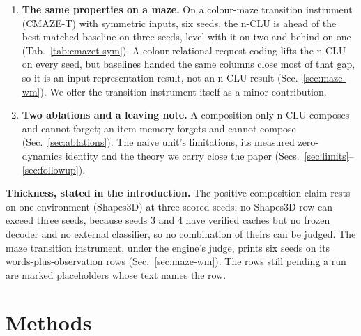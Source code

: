 \documentclass{article} %
\begin{document}
\begin{enumerate}
  separate, structural mechanism, a hole in a coupling table (Sec.~\ref{sec:hole}).
\item \textbf{The same properties on a maze.} On a colour-maze transition instrument (CMAZE-T) with
  symmetric inputs, six seeds, the n-CLU is ahead of
  the best matched baseline on three seeds, level with it on two and behind on one
  (Tab.~\ref{tab:cmazet-sym}). A colour-relational request coding lifts the n-CLU on every seed, but baselines handed the %
  same columns close most of that gap, so it is an input-representation result, not an n-CLU result
  (Sec.~\ref{sec:maze-wm}). We offer the transition instrument itself as a minor contribution.
\item \textbf{Two ablations and a leaving note.} A composition-only n-CLU composes and cannot
  forget; an item memory forgets and cannot compose (Sec.~\ref{sec:ablations}). The naive unit's
  limitations, its measured zero-dynamics identity and the theory we carry close the paper
  (Secs.~\ref{sec:limits}--\ref{sec:followup}).
\end{enumerate}

\noindent\textbf{Thickness, stated in the introduction.} The positive composition claim rests
on one environment (Shapes3D) at three scored seeds; no Shapes3D row can exceed three seeds,
because seeds 3 and 4 have verified caches but no frozen decoder and no external classifier, so no
combination of theirs can be judged. %
The maze transition instrument, under the engine's judge, prints six seeds on its words-plus-observation rows
(Sec.~\ref{sec:maze-wm}). The rows still pending a run are marked placeholders whose text names the row.

\section{Methods}
\label{sec:object}
\end{document}
